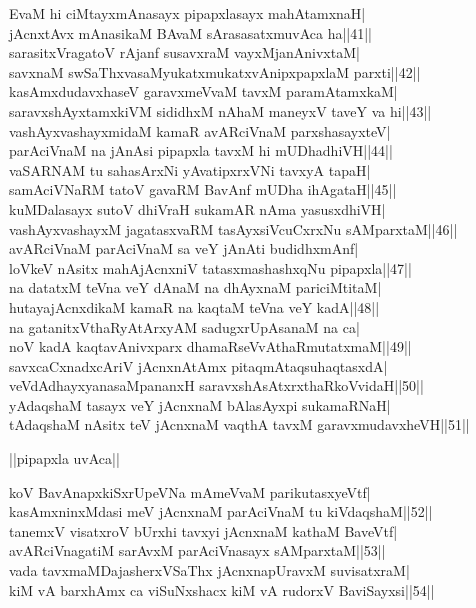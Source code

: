 \documentclass{article}
\begin{document}
EvaM hi ciMtayxmAnasayx pipapxlasayx mahAtamxnaH|\\
jAcnxtAvx mAnasikaM BAvaM sArasasatxmuvAca ha||41||\\
sarasitxVragatoV rAjanf susavxraM vayxMjanAnivxtaM|\\
savxnaM swSaThxvasaMyukatxmukatxvAnipxpapxlaM parxti||42||\\
kasAmxdudavxhaseV garavxmeVvaM tavxM paramAtamxkaM|\\
saravxshAyxtamxkiVM sididhxM nAhaM maneyxV taveY va hi||43||\\
vashAyxvashayxmidaM kamaR avARciVnaM parxshasayxteV|\\
parAciVnaM na jAnAsi pipapxla tavxM hi mUDhadhiVH||44||\\
vaSARNAM tu sahasArxNi yAvatipxrxVNi tavxyA tapaH|\\
samAciVNaRM tatoV gavaRM BavAnf mUDha ihAgataH||45||\\
kuMDalasayx sutoV dhiVraH sukamAR nAma yasusxdhiVH|\\
vashAyxvashayxM jagatasxvaRM tasAyxsiVcuCxrxNu sAMparxtaM||46||\\
avARciVnaM parAciVnaM sa veY jAnAti budidhxmAnf|\\
loVkeV nAsitx mahAjAcnxniV tatasxmashashxqNu pipapxla||47||\\
na datatxM teVna veY dAnaM na dhAyxnaM pariciMtitaM|\\
hutayajAcnxdikaM kamaR na kaqtaM teVna veY kadA||48||\\
na gatanitxVthaRyAtArxyAM sadugxrUpAsanaM na ca|\\
noV kadA kaqtavAnivxparx dhamaRseVvAthaRmutatxmaM||49||\\
savxcaCxnadxcAriV jAcnxnAtAmx pitaqmAtaqsuhaqtasxdA|\\
veVdAdhayxyanasaMpananxH saravxshAsAtxrxthaRkoVvidaH||50||\\
yAdaqshaM tasayx veY jAcnxnaM bAlasAyxpi sukamaRNaH|\\
tAdaqshaM nAsitx teV jAcnxnaM vaqthA tavxM garavxmudavxheVH||51||\\

\begin{center}
||pipapxla uvAca||
\end{center}

koV BavAnapxkiSxrUpeVNa mAmeVvaM parikutasxyeVtf|\\
kasAmxninxMdasi meV jAcnxnaM parAciVnaM tu kiVdaqshaM||52||\\
tanemxV visatxroV bUrxhi tavxyi jAcnxnaM kathaM BaveVtf|\\
avARciVnagatiM sarAvxM parAciVnasayx sAMparxtaM||53||\\
vada tavxmaMDajasherxVSaThx jAcnxnapUravxM suvisatxraM|\\
kiM vA barxhAmx ca viSuNxshacx kiM vA rudorxV BaviSayxsi||54||\\
\end{document}

